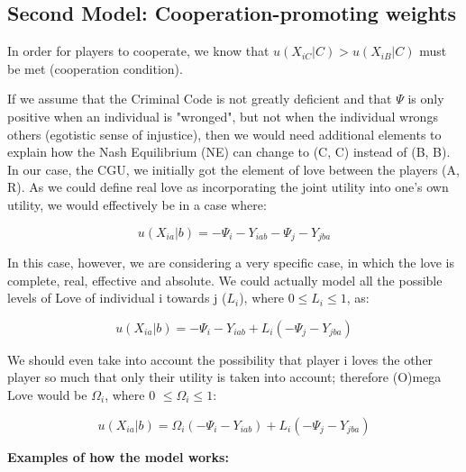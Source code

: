 \documentclass[11pt, a4paper]{article}
\begin{document}
\subsection*{Second Model: Cooperation-promoting weights}

In order for players to cooperate, we know that $u(X_{iC} | C) > u(X_{iB} | C)$ must be met (cooperation condition).

If we assume that the Criminal Code is not greatly deficient and that $\Psi$ is only positive when an individual is "wronged", but not when the individual wrongs others (egotistic sense of injustice), then we would need additional elements to explain how the Nash Equilibrium (NE) can change to (C, C) instead of (B, B). In our case, the CGU, we initially got the element of love between the players (A, R). As we could define real love as incorporating the joint utility into one's own utility, we would effectively be in a case where:

\begin{center}
    \begin{equation}
        u(X_{ia} | b) = -\Psi_i - Y_{iab} - \Psi_j - Y_{jba}
    \end{equation}
\end{center}

In this case, however, we are considering a very specific case, in which the love is complete, real, effective and absolute. We could actually model all the possible levels of Love of individual i towards j ($L_i$), where $0 \leq L_i \leq 1$, as:

\begin{center}
    \begin{equation}
        u(X_{ia} | b) = -\Psi_i - Y_{iab} + L_i(-\Psi_j - Y_{jba})
    \end{equation}
\end{center}

We should even take into account the possibility that player i loves the other player so much that only their utility is taken into account; therefore (O)mega Love would be $\Omega_i$, where 0 $\leq \Omega_i \leq 1$:

\begin{center}
    \begin{equation}
        u(X_{ia} | b) = \Omega_i(-\Psi_i - Y_{iab}) + L_i(-\Psi_j - Y_{jba})
    \end{equation}
\end{center}

\textbf{Examples of how the model works:}
\end{document}
